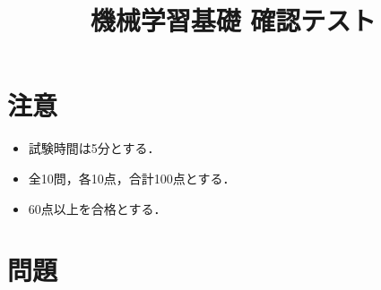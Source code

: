 \documentclass[uplatex,a4paper,12pt]{jsarticle}
\begin{document}
\title{機械学習基礎 確認テスト}
\author{}
\date{}
\maketitle

\section*{注意}
\begin{itemize}
\item 試験時間は5分とする．
\item 全10問，各10点，合計100点とする．
\item 60点以上を合格とする．
\end{itemize}

\section*{問題}
\end{document}
